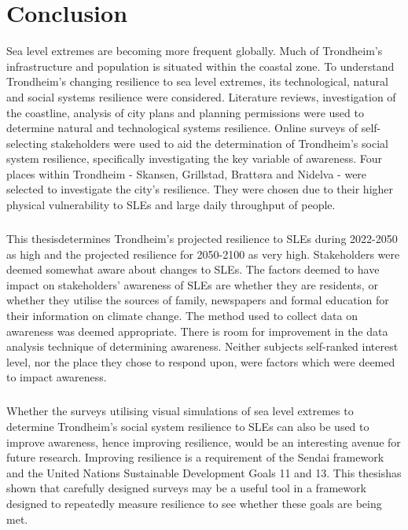 

\chapter{Conclusion}

Sea level extremes are becoming more frequent globally. Much of Trondheim's infrastructure and population is situated within the coastal zone. To understand Trondheim's changing resilience to sea level extremes, its technological, natural and social systems resilience were considered. Literature reviews, investigation of the coastline, analysis of city plans and planning permissions were used to determine natural and technological systems resilience. Online surveys of self-selecting stakeholders were used to aid the determination of Trondheim's social system resilience, specifically investigating the key variable of awareness. Four places within Trondheim - Skansen, Grillstad, Brattøra and Nidelva - were selected to investigate the city's resilience. They were chosen due to their higher physical vulnerability to SLEs and large daily throughput of people.
\paragraph{}
This thesisdetermines Trondheim's projected resilience to SLEs during 2022-2050 as high and the projected resilience for 2050-2100 as very high. Stakeholders were deemed somewhat aware about changes to SLEs. The factors deemed to have impact on stakeholders' awareness of SLEs are whether they are residents, or whether they utilise the sources of family, newspapers and formal education for their information on climate change. The method used to collect data on awareness was deemed appropriate. There is room for improvement in the data analysis technique of determining awareness. Neither subjects self-ranked interest level, nor the place they chose to respond upon, were factors which were deemed to impact awareness.
\paragraph{}

Whether the surveys utilising visual simulations of sea level extremes to determine Trondheim's social system resilience to SLEs can also be used to improve awareness, hence improving resilience, would be an interesting avenue for future research. Improving resilience is a requirement of the Sendai framework and the United Nations Sustainable Development Goals 11 and 13. This thesishas shown that carefully designed surveys may be a useful tool in a framework designed to repeatedly measure resilience to see whether these goals are being met.